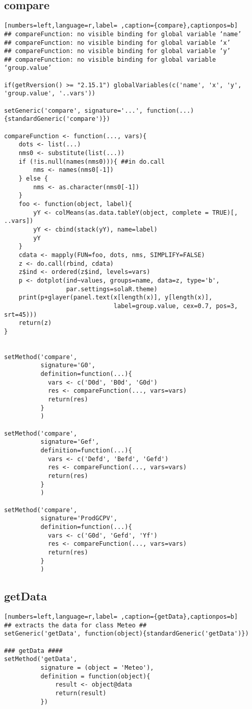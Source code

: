 \subsection{compare}
\label{sec:org0696965}
\label{subsec:compare}
\begin{lstlisting}[numbers=left,language=r,label= ,caption={compare},captionpos=b]
## compareFunction: no visible binding for global variable ‘name’
## compareFunction: no visible binding for global variable ‘x’
## compareFunction: no visible binding for global variable ‘y’
## compareFunction: no visible binding for global variable ‘group.value’

if(getRversion() >= "2.15.1") globalVariables(c('name', 'x', 'y', 'group.value', '..vars'))

setGeneric('compare', signature='...', function(...){standardGeneric('compare')})

compareFunction <- function(..., vars){
    dots <- list(...)
    nms0 <- substitute(list(...))
    if (!is.null(names(nms0))){ ##in do.call
        nms <- names(nms0[-1])
    } else {
        nms <- as.character(nms0[-1])
    }
    foo <- function(object, label){
        yY <- colMeans(as.data.tableY(object, complete = TRUE)[, ..vars])
        yY <- cbind(stack(yY), name=label)
        yY
    }
    cdata <- mapply(FUN=foo, dots, nms, SIMPLIFY=FALSE)
    z <- do.call(rbind, cdata)
    z$ind <- ordered(z$ind, levels=vars)
    p <- dotplot(ind~values, groups=name, data=z, type='b',
                 par.settings=solaR.theme)
    print(p+glayer(panel.text(x[length(x)], y[length(x)],
                              label=group.value, cex=0.7, pos=3, srt=45)))
    return(z)
}


setMethod('compare',
          signature='G0',
          definition=function(...){
            vars <- c('D0d', 'B0d', 'G0d')
            res <- compareFunction(..., vars=vars)
            return(res)
          }
          )

setMethod('compare',
          signature='Gef',
          definition=function(...){
            vars <- c('Defd', 'Befd', 'Gefd')
            res <- compareFunction(..., vars=vars)
            return(res)
          }
          )

setMethod('compare',
          signature='ProdGCPV',
          definition=function(...){
            vars <- c('G0d', 'Gefd', 'Yf')
            res <- compareFunction(..., vars=vars)
            return(res)
          }
          )
\end{lstlisting}
\subsection{getData}
\label{sec:org995d948}
\label{subsec:getData}
\begin{lstlisting}[numbers=left,language=r,label= ,caption={getData},captionpos=b]
## extracts the data for class Meteo ##
setGeneric('getData', function(object){standardGeneric('getData')})

### getData ####
setMethod('getData',
          signature = (object = 'Meteo'),
          definition = function(object){
              result <- object@data
              return(result)
          })
\end{lstlisting}
